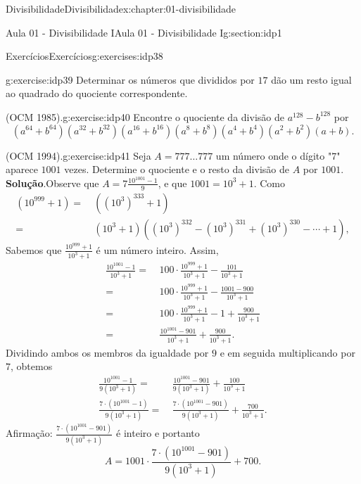\documentclass[oneside,10pt,]{book}
\newcommand{\blocktitlefont}{\relax}
\numberwithin{equation}{section}
\newcommand{\amp}{&}
\begin{document}
\begin{chapterptx}{Divisibilidade}{}{Divisibilidade}{}{}{x:chapter:01-divisibilidade}
\begin{sectionptx}{Aula 01 - Divisibilidade I}{}{Aula 01 - Divisibilidade I}{}{}{g:section:idp1}
\begin{exercises-subsection}{Exercícios}{}{Exercícios}{}{}{g:exercises:idp38}
\begin{divisionexercise}{1}{}{}{g:exercise:idp39}%
Determinar os números que divididos por \(17\) dão um resto igual ao quadrado do quociente correspondente.%
\end{divisionexercise}%
\begin{divisionexercise}{2}{(OCM 1985).}{}{g:exercise:idp40}%
Encontre o quociente da divisão de \(a^{128}-b^{128}\) por%
\begin{equation*}
(a^{64}+b^{64})(a^{32}+b^{32})(a^{16}+b^{16})(a^{8}+b^{8})(a^{4}+b^{4})(a^{2}+b^{2})(a+b).
\end{equation*}
%
\end{divisionexercise}%
\begin{divisionexercise}{3}{(OCM 1994).}{}{g:exercise:idp41}%
Seja \(A=777\ldots 777\) um número onde o dígito "\(7\)" aparece \(1001\) vezes. Determine o quociente e o resto da divisão de \(A\) por \(1001\).%
\textbf{\blocktitlefont Solução}.\hypertarget{g:solution:idp42}{}\quad{}Observe que \(A = 7\frac{10^{1001}-1}{9}\), e que \(1001 = 10^3+1\). Como%
\begin{align*}
(10^{999}+1)=\amp~((10^3)^{333}+1)\\
=\amp~(10^3+1)((10^3)^{332}-(10^3)^{331}+(10^3)^{330}-\cdots+1),
\end{align*}
Sabemos que \(\frac{10^{999}+1}{10^3+1}\) é um número inteiro. Assim,%
\begin{align*}
\frac{10^{1001}-1}{10^3+1} =\amp~100\cdot\frac{10^{999}+1}{10^3+1}-\frac{101}{10^3+1}\\
=\amp~100\cdot\frac{10^{999}+1}{10^3+1}-\frac{1001-900}{10^3+1}\\
=\amp~100\cdot\frac{10^{999}+1}{10^3+1}-1+\frac{900}{10^3+1}\\
=\amp~\frac{10^{1001}-901}{10^3+1}+\frac{900}{10^3+1}.
\end{align*}
Dividindo ambos os membros da igualdade por \(9\) e em seguida multiplicando por \(7\), obtemos%
\begin{align*}
\frac{10^{1001}-1}{9(10^3+1)} =\amp~\frac{10^{1001}-901}{9(10^3+1)}+\frac{100}{10^3+1}\\
\frac{7\cdot(10^{1001}-1)}{9(10^3+1)} =\amp~\frac{7\cdot(10^{1001}-901)}{9(10^3+1)}+\frac{700}{10^3+1}.
\end{align*}
Afirmação: \(\frac{7\cdot(10^{1001}-901)}{9(10^3+1)}\) é inteiro e portanto%
\begin{equation*}
A = 1001\cdot \frac{7\cdot(10^{1001}-901)}{9(10^3+1)} + 700.
\end{equation*}

\end{divisionexercise}
\end{exercises-subsection}
\end{sectionptx}
\end{chapterptx}
\end{document}
